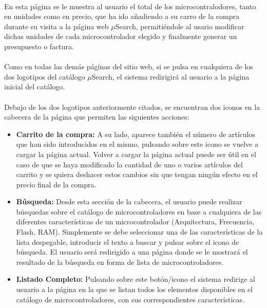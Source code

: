 \paragraph{}En esta página se le muestra al usuario el total de los microcontralodores, tanto en unidades como en precio, que ha ido añadiendo a su carro de la compra durante su visita a la página web $\mu$Search, permitiéndole al usario modificar dichas unidades de cada microcontrolador elegido y finalmente generar un presupuesto o factura.

\paragraph{}Como en todas las demás páginas del sitio web, si se pulsa en cualquiera de los dos logotipos del catálogo $\mu$Search, el sistema redirigirá al usuario a la página inicial del catálogo.

\paragraph{}Debajo de los dos logotipos anteriormente citados, se encuentran dos iconos en la cabecera de la página que permiten las siguientes acciones:

\begin{itemize}
	\item \textbf{Carrito de la compra:} A su lado, aparece también el número de artículos que han sido introducidos en el mismo, pulsando sobre este icono se vuelve a cargar la página actual. Volver a cargar la página actual puede ser útil en el caso de que se haya modificado la cantidad de uno o varios artículos del carrito y se quiera deshacer estos cambios sin que tengan ningún efecto en el precio final de la compra.

	\item \textbf{Búsqueda:} Desde esta sección de la cabecera, el usuario puede realizar búsquedas sobre el catálogo de microcontroladores en base a cualquiera de las diferentes características de un microcontrolador (Arquitectura, Frecuencia, Flash, RAM). Simplemente se debe seleccionar una de las características de la lista despegable, introducir el texto a buscar y pulsar sobre el icono de búsqueda.
	El usuario será redirigido a una página donde se le mostrará el resultado de la búsqueda en forma de lista de microcontroladores.

	\item \textbf{Listado Completo:} Pulsando sobre este botón/icono el sistema redirige al usuario a la página en la que se listan todos los elementos disponibles en el catálogo de microcontroladores, con sus correspondientes características.
\end{itemize}

